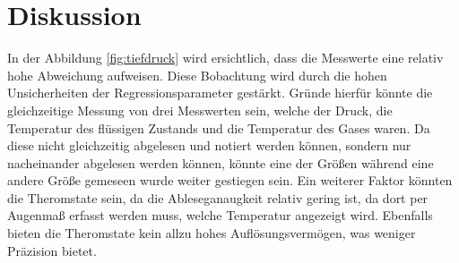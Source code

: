 \section{Diskussion}
\label{sec:Diskussion}
In der Abbildung \ref{fig:tiefdruck} wird ersichtlich, dass die Messwerte eine relativ hohe Abweichung aufweisen.
Diese Bobachtung wird durch die hohen Unsicherheiten der Regressionsparameter gestärkt.
Gründe hierfür könnte die gleichzeitige Messung von drei Messwerten sein, welche der Druck, die Temperatur des flüssigen Zustands und die Temperatur des Gases 
waren.
Da diese nicht gleichzeitig abgelesen und notiert werden können, sondern nur nacheinander abgelesen werden können, könnte eine der Größen während eine andere Größe gemeseen wurde
weiter gestiegen sein.
Ein weiterer Faktor könnten die Theromstate sein, da die Ableseganaugkeit relativ gering ist, da dort per Augenmaß erfasst werden muss, welche Temperatur angezeigt wird.
Ebenfalls bieten die Theromstate kein allzu hohes Auflösungsvermögen, was weniger Präzision bietet. 